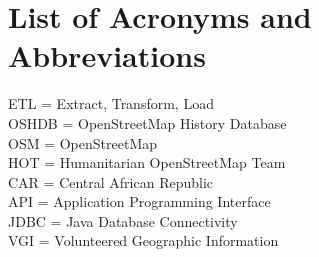 \chapter*{List of Acronyms and Abbreviations}

ETL = Extract, Transform, Load \\
OSHDB = OpenStreetMap History Database \\
OSM = OpenStreetMap \\
HOT = Humanitarian OpenStreetMap Team \\
CAR = Central African Republic \\
API = Application Programming Interface \\
JDBC = Java Database Connectivity \\
VGI = Volunteered Geographic Information \\

